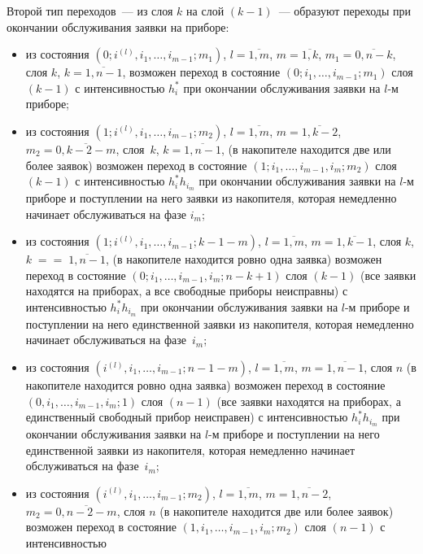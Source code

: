\begin{multicols}{2}
Второй тип переходов~--- из слоя $k$ на слой $(k-1)$~--- образуют
переходы при окончании обслуживания заявки на приборе:
\begin{itemize}
\item из состояния $\left(0;i^{(l)},i_1,\ldots,i_{m-1};m_1\right)$,
$l=\overline{1,m}$, $m=\overline{1,k}$,
$m_1=\overline{0,n-k}$, слоя $k$, $k=\overline{1,n-1}$,
возможен переход в состояние $\left(0;i_1,\ldots, i_{m-1};m_1\right)$
слоя $(k-1)$ с интенсивностью $h_i^*$ при окончании обслуживания
заявки на $l$-м приборе;
\item
 из состояния $\left(1;i^{(l)},i_1,\ldots,i_{m-1};m_2\right)$,
$l=\overline{1,m}$, $m=\overline{1,k-2}$,
$m_2=\overline{0,k-2-m}$, слоя~$k$, $k=\overline{1,n-1}$,
(в накопителе находится две или более заявок)
возможен переход в состояние $\left(1;i_1,\ldots,i_{m-1},i_m;m_2\right)$
слоя $(k-1)$ с интенсивностью $h_i^* h_{i_m}$ при окончании
обслуживания заявки на $l$-м приборе и поступлении на него
заявки из накопителя, которая немедленно начинает обслуживаться
на фазе $i_m$;
\item
 из состояния $\left(1;i^{(l)},i_1,\ldots,i_{m-1};k-1-m\right)$,
$l=\overline{1,m}$, $m=\overline{1,k-1}$,
слоя $k$, $k\;=$\linebreak $=\;\overline{1,n-1}$,
(в накопителе находится ровно одна заявка) возможен переход
в состояние $\left(0;i_1,\ldots,i_{m-1},i_m;n-k+1\right)$ слоя $(k-1)$
(все заявки находятся на приборах, а все свободные приборы
неисправны) с интенсивностью $h_i^* h_{i_m}$ при окончании
обслуживания заявки на $l$-м приборе и поступлении на него
единственной заявки из накопителя, которая немедленно начинает
обслуживаться на фазе~$i_m$;
\item
из состояния $\left(i^{(l)},i_1,\ldots,i_{m-1};n-1-m\right)$,\linebreak
$l=\overline{1,m}$, $m=\overline{1,n-1}$,
слоя $n$ (в накопителе находится ровно одна заявка) возможен
переход в состояние $(0,i_1,\ldots,i_{m-1},i_m;1)$ слоя $(n-1)$
(все заявки находятся на приборах, а единственный свободный
прибор неисправен) с ин\-тен\-сив\-ностью $h_i^*h_{i_m}$ при окончании
обслуживания заявки на $l$-м приборе и поступлении на него
единственной заявки из накопителя, которая немедленно начинает
обслуживаться на фазе~$i_m$;
\item
 из состояния $\left(i^{(l)},i_1,\ldots,i_{m-1};m_2\right)$,
$l=\overline{1,m}$, $m=\overline{1,n-2}$,
$m_2=\overline{0,n-2-m}$, слоя $n$ (в накопителе находится две
или более заявок) возможен переход в состояние
$\left(1,i_1,\ldots, i_{m-1},i_m;m_2\right)$ слоя $(n-1)$ с интенсивностью

\end{itemize}
\end{multicols}

